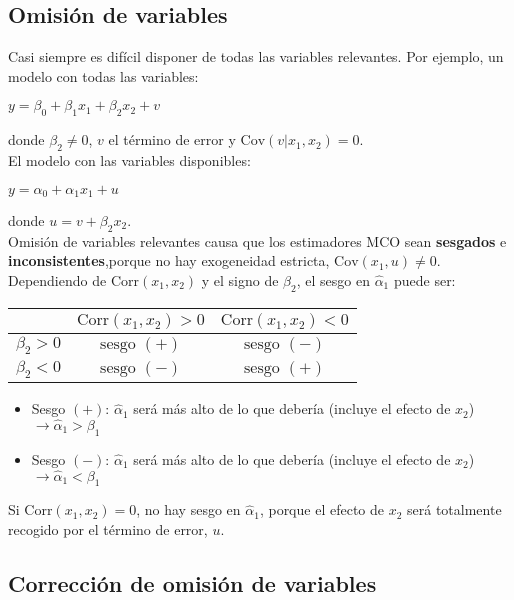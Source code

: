 \documentclass[10pt, a4paper, landscape]{extarticle}
\newcommand{\Cov}{\mathrm{Cov}}
\newcommand{\Corr}{\mathrm{Corr}}
\begin{document}
\begin{multicols}{3}
\section*{Omisión de variables}
	Casi siempre es difícil disponer de todas las variables relevantes. Por ejemplo, un modelo con todas las variables:
	\begin{center}
		$y = \beta_0 + \beta_1 x_1 + \beta_2 x_2 + v$
	\end{center}
	\quad donde $\beta_2 \neq 0$, $v$ el término de error y $\Cov(v|x_1,x_2) = 0$. \\
	El modelo con las variables disponibles:
	\begin{center}
		$y = \alpha_0 + \alpha_1 x_1 + u$
	\end{center}
	\quad donde $u = v + \beta_2 x_2$. \\
	Omisión de variables relevantes causa que los estimadores MCO sean \textbf{sesgados} e \textbf{inconsistentes},porque no hay exogeneidad estricta, $\Cov(x_1,u) \neq 0$. Dependiendo de $\Corr(x_1, x_2)$ y el signo de $\beta_2$, el sesgo en $\hat{\alpha}_1$ puede ser:
	\begin{center}
		\begin{tabular}{| c | c | c |}
			\cline{2-3}
			\multicolumn{1}{c|}{} & $\Corr(x_1, x_2) > 0$ & $\Corr(x_1, x_2) < 0$ \\ \hline
			$\beta_2 > 0$         & $\text{sesgo } (+)$   & $\text{sesgo } (-)$   \\ \hline
			$\beta_2 < 0$         & $\text{sesgo } (-)$   & $\text{sesgo } (+)$   \\ \hline
		\end{tabular}
	\end{center}
	\begin{itemize}[leftmargin=*]
		\item Sesgo $(+)$: $\hat{\alpha}_1$ será más alto de lo que debería (incluye el efecto de $x_2$) $\rightarrow \hat{\alpha}_1 > \beta_1$
		\item Sesgo $(-)$: $\hat{\alpha}_1$ será más alto de lo que debería (incluye el efecto de $x_2$) $\rightarrow \hat{\alpha}_1 < \beta_1$
	\end{itemize}
	Si $\Corr(x_1,x_2) = 0$, no hay sesgo en $\hat{\alpha}_1$, porque el efecto de $x_2$ será totalmente recogido por el término de error, $u$.
\columnbreak
	\subsection*{Corrección de omisión de variables}

\end{multicols}
\end{document}
